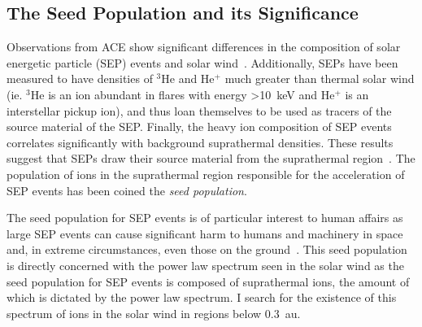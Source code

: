 \documentclass[letterpaper,11pt]{article}
\begin{document}

\subsection{The Seed Population and its Significance}
Observations from ACE show significant differences in the composition of solar energetic particle (SEP) events and solar wind~\citep{Mewaldt2012}.  Additionally, SEPs have been measured to have densities of ${}^3$He and He${}^+$ much greater than thermal solar wind (ie. ${}^3$He is an ion abundant in flares with energy \SI{>10}{\kilo\electronvolt} and He${}^+$ is an interstellar pickup ion), and thus loan themselves to be used as tracers of the source material of the SEP.  Finally, the heavy ion composition of SEP events correlates significantly with background suprathermal densities.  These results suggest that SEPs draw their source material from the suprathermal region~\citep{Desai2006}.  The population of ions in the suprathermal region responsible for the acceleration of SEP events has been coined the \textit{seed population}.


The seed population for SEP events is of particular interest to human affairs as large SEP events can cause significant harm to humans and machinery in space and, in extreme circumstances, even those on the ground~\citep{Desai2016}.  This seed population is directly concerned with the power law spectrum seen in the solar wind as the seed population for SEP events is composed of suprathermal ions, the amount of which is dictated by the power law spectrum.  I search for the existence of this spectrum of ions in the solar wind in regions below \SI{0.3}{\astronomicalunit}.
\end{document}

